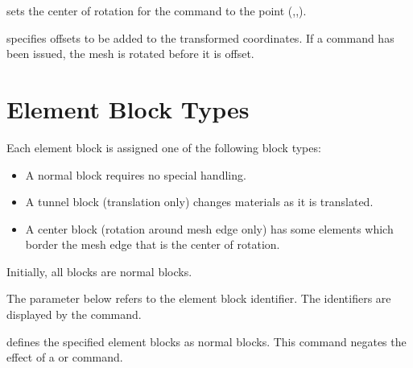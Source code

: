  {
 sets the center of rotation for the  command
to the point (,,).
}

\newpage %
 {
 specifies offsets to be added to the transformed 
coordinates. If a  command has been issued, the 
mesh is rotated before it is offset.
}

\newpage
\section{Element Block Types}
\label{cmd:blocktypes}

Each element block is assigned one of the following block types:
\setlength{\itemsep}{\smallskipamount} \begin{itemize}
\item A normal block requires no special handling.
\item A tunnel block (translation only) changes materials as it is
translated.
\item A center block (rotation around mesh edge only) has some elements
which border the mesh edge that is the center of rotation.
\end{itemize}

Initially, all blocks are normal blocks.

The  parameter below refers to the element block identifier.
The identifiers are displayed by the  command.

 {
 defines the specified element blocks 
as normal blocks. This command
negates the effect of a  or  command.
}

